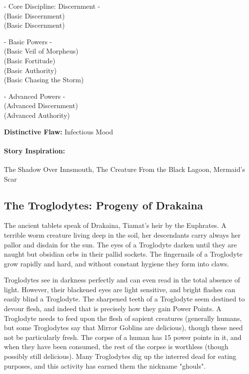 \hspace{\parindent} - Core Discipline: Discernment -\\
 (Basic Discernment)\\
 (Basic Discernment)

- Basic Powers -\\
 (Basic Veil of Morpheus)\\
 (Basic Fortitude)\\
 (Basic Authority)\\
 (Basic Chasing the Storm)

- Advanced Powers -\\
 (Advanced Discernment)\\
 (Advanced Authority)

\textbf{Distinctive Flaw:} Infectious Mood

\paragraph{Story Inspiration:} The Shadow Over Innsmouth, The Creature From the Black Lagoon, Mermaid's Scar

\subsection[Troglodytes]{The Troglodytes: Progeny of Drakaina} 

The ancient tablets speak of Drakaina, Tiamat's heir by the Euphrates. A terrible worm creature living deep in the soil, her descendants carry always her pallor and disdain for the sun. The eyes of a Troglodyte darken until they are naught but obsidian orbs in their pallid sockets. The fingernails of a Troglodyte grow rapidly and hard, and without constant hygiene they form into claws.

Troglodytes see in darkness perfectly and can even read in the total absence of light. However, their blackened eyes are light sensitive, and bright flashes can easily blind a Troglodyte. The sharpened teeth of a Troglodyte seem destined to devour flesh, and indeed that is precisely how they gain Power Points. A Troglodyte needs to feed upon the flesh of sapient creatures (generally humans, but some Troglodytes say that Mirror Goblins are delicious), though these need not be particularly fresh. The corpse of a human has 15 power points in it, and when they have been consumed, the rest of the corpse is worthless (though possibly still delicious). Many Troglodytes dig up the interred dead for eating purposes, and this activity has earned them the nickname "ghouls".

